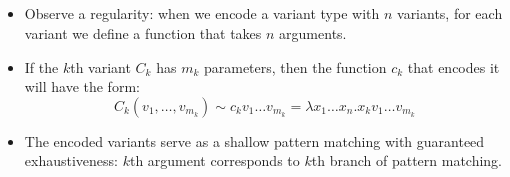 \documentclass{beamer}
\begin{document}
{}{}{\hlopt{= }}{}{}{\hlopt{->
}}{}{\hlendline{}}\\
{}{}{\hlopt{= }}{}{}{\hlopt{-> }}{}{\hlendline{}}\\
{}{}{\hlopt{=}}{\hlendline{}}\\
{\hlstd{ \ }}{}{\hlopt{(}}{}{}{\hlopt{->
}}{}{\hlopt{(}}{}{}{\hlopt{->
}}{}{\hlopt{(}}{}{\hlopt{))
}}{}{\hlopt{) }}{}{\hlendline{}}\\
{\hlopt{;;}}{\hlendline{}}\\
{}{\hlopt{(}}{}{\hlopt{(}}{}{\hlopt{(}}{}{\hlopt{(}}{}{\hlopt{))));;}}{\hlendline{}}\\
{}{}{\hlopt{= }}{}{}{\hlopt{-> }}{}{\hlendline{}}\\
{}{}{\hlopt{= }}{}{}{\hlopt{-> }}{}{\hlendline{}}\\
{}{}{\hlopt{=}}{\hlendline{}}\\
{\hlstd{ \ }}{}{\hlopt{(}}{}{}{\hlopt{->}}{\hlendline{}}\\
{}{\hlopt{(}}{}{}{\hlopt{->
}}{}{\hlopt{) (}}{}{}{\hlopt{->
}}{}{\hlopt{(}}{}{\hlopt{)
(}}{}{\hlopt{))}}{\hlendline{}}\\
{\hlstd{ \ }}{\hlopt{) }}{}{\hlendline{}}\\
{\hlopt{;;}}{\hlendline{}}\\
{}{\hlopt{(}}{}{\hlopt{(}}{}{\hlopt{(}}{}{\hlopt{(}}{}{\hlopt{)
(}}{}{\hlopt{))}}{\hlendline{}}\\
{\hlstd{ \ \ \ \ \ \ \ \ \ \ \ \ \ }}{\hlopt{(}}{}{\hlopt{)));;}}{\hlendline{}}{\newpage}
\begin{itemize}
  \item Observe a regularity: when we encode a variant type with $n$ variants,
  for each variant we define a function that takes $n$ arguments.
  
  \item If the $k$th variant $C_k$ has $m_k$ parameters, then the function
  $c_k$ that encodes it will have the form:
  \[ C_k (v_1, \ldots, v_{m_k}) \sim c_k v_1 \ldots v_{m_k} = \lambda x_1
     \ldots x_n .x_k v_1 \ldots v_{m_k} \]
  \item The encoded variants serve as a shallow pattern matching with
  guaranteed exhaustiveness: $k$th argument corresponds to $k$th branch of
  pattern matching.
\end{itemize}
\end{document}
